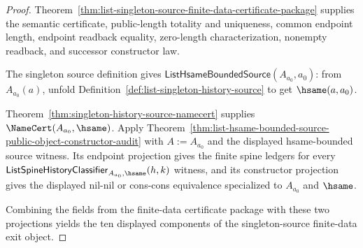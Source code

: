 \begin{proof}
Theorem~\ref{thm:list-singleton-source-finite-data-certificate-package}
supplies the semantic certificate, public-length totality and uniqueness,
common endpoint length, endpoint readback equality, zero-length
characterization, nonempty readback, and successor constructor law.

The singleton source definition gives
$\mathsf{ListHsameBoundedSource}(A_{a_0},a_0)$: from
$A_{a_0}(a)$, unfold Definition~\ref{def:list-singleton-history-source} to get
$\hsame(a,a_0)$.

Theorem~\ref{thm:singleton-history-source-namecert} supplies
$\NameCert(A_{a_0},\hsame)$. Apply
Theorem~\ref{thm:list-hsame-bounded-source-public-object-constructor-audit}
with $A:=A_{a_0}$ and the displayed hsame-bounded source witness. Its endpoint
projection gives the finite spine ledgers for every
$\mathsf{ListSpineHistoryClassifier}_{A_{a_0},\hsame}(h,k)$ witness, and its
constructor projection gives the displayed nil-nil or cons-cons equivalence
specialized to $A_{a_0}$ and $\hsame$.

Combining the fields from the finite-data certificate package with these two
projections yields the ten displayed components of the singleton-source
finite-data exit object.
\end{proof}
